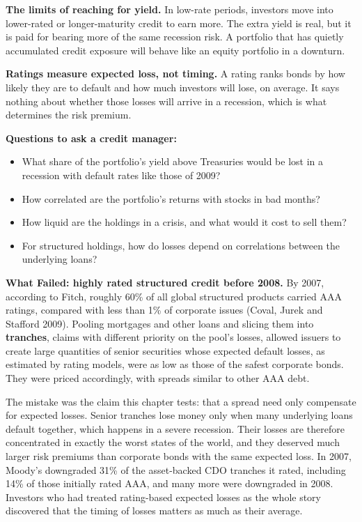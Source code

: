 \textbf{The limits of reaching for yield.} In low-rate periods, investors move into lower-rated or longer-maturity credit to earn more. The extra yield is real, but it is paid for bearing more of the same recession risk. A portfolio that has quietly accumulated credit exposure will behave like an equity portfolio in a downturn.

\textbf{Ratings measure expected loss, not timing.} A rating ranks bonds by how likely they are to default and how much investors will lose, on average. It says nothing about whether those losses will arrive in a recession, which is what determines the risk premium.

\textbf{Questions to ask a credit manager:}

\begin{itemize}
  \item What share of the portfolio's yield above Treasuries would be lost in a recession with default rates like those of 2009?
  \item How correlated are the portfolio's returns with stocks in bad months?
  \item How liquid are the holdings in a crisis, and what would it cost to sell them?
  \item For structured holdings, how do losses depend on correlations between the underlying loans?
\end{itemize}

\begin{callout}
\textbf{What Failed: highly rated structured credit before 2008.} By 2007, according to Fitch, roughly 60\% of all global structured products carried AAA ratings, compared with less than 1\% of corporate issues (Coval, Jurek and Stafford 2009). Pooling mortgages and other loans and slicing them into \textbf{tranches}, claims with different priority on the pool's losses, allowed issuers to create large quantities of senior securities whose expected default losses, as estimated by rating models, were as low as those of the safest corporate bonds. They were priced accordingly, with spreads similar to other AAA debt.

The mistake was the claim this chapter tests: that a spread need only compensate for expected losses. Senior tranches lose money only when many underlying loans default together, which happens in a severe recession. Their losses are therefore concentrated in exactly the worst states of the world, and they deserved much larger risk premiums than corporate bonds with the same expected loss. In 2007, Moody's downgraded 31\% of the asset-backed CDO tranches it rated, including 14\% of those initially rated AAA, and many more were downgraded in 2008. Investors who had treated rating-based expected losses as the whole story discovered that the timing of losses matters as much as their average.
\end{callout}

